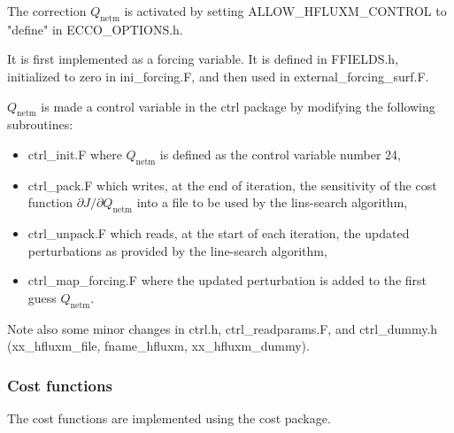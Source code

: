 The correction $Q_\mathrm{netm}$ is activated by setting ALLOW\_HFLUXM\_CONTROL to "define" in ECCO\_OPTIONS.h.

It is first implemented as a forcing variable. It is defined in FFIELDS.h,
initialized to zero in ini\_forcing.F, and then used in external\_forcing\_surf.F.

$Q_\mathrm{netm}$ is made a control variable in the ctrl package by modifying the following subroutines:

\begin{itemize}
\item ctrl\_init.F where $Q_\mathrm{netm}$ is defined as the control variable number 24,

\item ctrl\_pack.F which writes, at the end of iteration, the sensitivity of the cost function
$\partial J/\partial Q_\mathrm{netm}$ into a file to be used by the lins-search algorithm,

\item ctrl\_unpack.F which reads, at the start of each iteration, the updated perturbations as
provided by the line-search algorithm,

\item ctrl\_map\_forcing.F where the updated perturbation is added to the first guess $Q_\mathrm{netm}$.
\end{itemize}

Note also some minor changes in ctrl.h, ctrl\_readparams.F, and ctrl\_dummy.h (xx\_hfluxm\_file,
fname\_hfluxm, xx\_hfluxm\_dummy).

\subsubsection{Cost functions}

The cost functions are implemented using the cost package.

